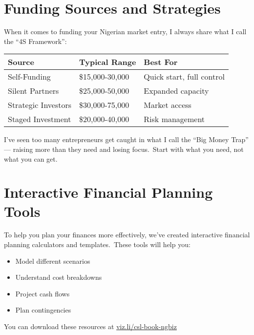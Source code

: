 \section{Funding Sources and Strategies}\label{sec:funding-sources}

When it comes to funding your Nigerian market entry, I always share what I call the ``4S Framework'':

\begin{center}
\begin{tabularx}{\textwidth}{>{\raggedright\arraybackslash}X >{\centering\arraybackslash}X >{\raggedright\arraybackslash}X}
    \toprule
    \textbf{Source} & \textbf{Typical Range} & \textbf{Best For} \\
    \midrule
    Self-Funding & \$15,000-30,000 & Quick start, full control \\
    Silent Partners & \$25,000-50,000 & Expanded capacity \\
    Strategic Investors & \$30,000-75,000 & Market access \\
    Staged Investment & \$20,000-40,000 & Risk management \\
    \bottomrule
\end{tabularx}
\end{center}

\begin{warningbox}
I've seen too many entrepreneurs get caught in what I call the ``Big Money Trap'' --- raising more than they need and losing focus.\ Start with what you need, not what you can get.
\end{warningbox}

\section{Interactive Financial Planning Tools}\label{sec:financial-tools}

To help you plan your finances more effectively, we've created interactive financial planning calculators and templates.\ These tools will help you:

\begin{itemize}
    \item Model different scenarios
    \item Understand cost breakdowns
    \item Project cash flows
    \item Plan contingencies
\end{itemize}

You can download these resources at \href{https://viz.li/csl-book-ngbiz}{viz.li/csl-book-ngbiz}

